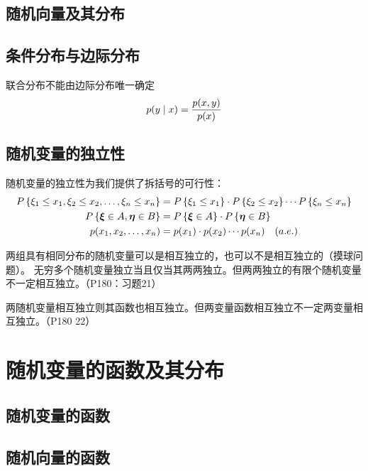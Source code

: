 \subsection{随机向量及其分布}
\subsection{条件分布与边际分布}
联合分布不能由边际分布唯一确定
\[
    p(y\mid x)=\frac{p(x,y)}{p(x)} \\
\]

\subsection{随机变量的独立性}
随机变量的独立性为我们提供了拆括号的可行性：
\begin{align*}
    P\left\{\xi_{1} \leq x_{1}, \xi_{2} \leq x_{2}, \dots ,
    \xi_{n} \leq x_{n}\right\} &=
    P\left\{\xi_{1} \leq x_{1}\right\} \cdot
    P\left\{\xi_{2} \leq x_{2}\right\} \cdots
    P\left\{\xi_{n} \leq x_{n}\right\}\\
    P\left\{\bm{\xi} \in A, \bm{\eta} \in B\right\} &=
    P\left\{\bm{\xi} \in A\right\} \cdot
    P\left\{\bm{\eta} \in B\right\} \\
    p(x_{1},x_{2},\ldots,x_{n}) &= p(x_{1}) \cdot p(x_{2})
    \cdots p(x_{n}) \quad (a. e.)
\end{align*}

两组具有相同分布的随机变量可以是相互独立的，也可以不是相互独立的（摸球问题）。
无穷多个随机变量独立当且仅当其两两独立。但两两独立的有限个随机变量不一定相互独立。（P180：习题21）

两随机变量相互独立则其函数也相互独立。但两变量函数相互独立不一定两变量相互独立。（P180 22）

\section{随机变量的函数及其分布}
\subsection{随机变量的函数}
\subsection{随机向量的函数}

